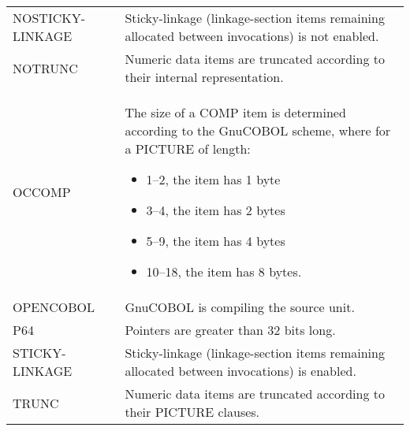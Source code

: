\begin{centering}
\begin{longtable}[!h]{p{} p{}}
    NOSTICKY-LINKAGE & Sticky-linkage (linkage-section items remaining allocated between invocations) is not enabled. \\

    NOTRUNC & Numeric data items are truncated according to their internal representation. \\

    OCCOMP & The size of a COMP item is determined according to the GnuCOBOL scheme, where for a PICTURE of length:
    \begin{itemize}
    \item 1--2, the item has 1 byte
    \item 3--4, the item has 2 bytes
    \item 5--9, the item has 4 bytes
    \item 10--18, the item has 8 bytes.
    \end{itemize} \\

    OPENCOBOL & GnuCOBOL is compiling the source unit. \\

    P64 & Pointers are greater than 32 bits long. \\

    STICKY-LINKAGE & Sticky-linkage (linkage-section items remaining allocated between invocations) is enabled. \\

    TRUNC & Numeric data items are truncated according to their PICTURE clauses. \\
    \bottomrule
  \end{longtable}
\end{centering}


